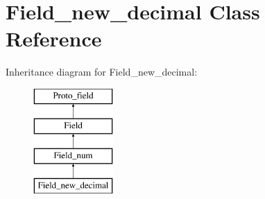 \hypertarget{classField__new__decimal}{}\section{Field\+\_\+new\+\_\+decimal Class Reference}
\label{classField__new__decimal}
Inheritance diagram for Field\+\_\+new\+\_\+decimal\+:\begin{figure}[H]
\begin{center}
\leavevmode
\includegraphics[height=4.000000cm]{classField__new__decimal}
\end{center}
\end{figure}
